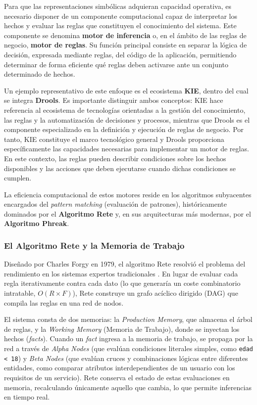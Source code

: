 \documentclass[12pt,a4paper]{report}
\begin{document}
Para que las representaciones simbólicas adquieran capacidad operativa, es necesario disponer de un componente computacional capaz de interpretar los hechos y evaluar las reglas que constituyen el conocimiento del sistema. Este componente se denomina \textbf{motor de inferencia} o, en el ámbito de las reglas de negocio, \textbf{motor de reglas}. Su función principal consiste en separar la lógica de decisión, expresada mediante reglas, del código de la aplicación, permitiendo determinar de forma eficiente qué reglas deben activarse ante un conjunto determinado de hechos.

Un ejemplo representativo de este enfoque es el ecosistema \textbf{KIE}, dentro del cual se integra \textbf{Drools}. Es importante distinguir ambos conceptos: KIE hace referencia al ecosistema de tecnologías orientadas a la gestión del conocimiento, las reglas y la automatización de decisiones y procesos, mientras que Drools es el componente especializado en la definición y ejecución de reglas de negocio. Por tanto, KIE constituye el marco tecnológico general y Drools proporciona específicamente las capacidades necesarias para implementar un motor de reglas. En este contexto, las reglas pueden describir condiciones sobre los hechos disponibles y las acciones que deben ejecutarse cuando dichas condiciones se cumplen.

La eficiencia computacional de estos motores reside en los algoritmos subyacentes encargados del \textit{pattern matching} (evaluación de patrones), históricamente dominados por el \textbf{Algoritmo Rete} y, en sus arquitecturas más modernas, por el \textbf{Algoritmo Phreak}.

\subsubsection{El Algoritmo Rete y la Memoria de Trabajo}
Diseñado por Charles Forgy en 1979, el algoritmo Rete resolvió el problema del rendimiento en los sistemas expertos tradicionales \cite{forgy1979rete}. En lugar de evaluar cada regla iterativamente contra cada dato (lo que generaría un coste combinatorio intratable, $O(R \times F)$), Rete construye un grafo acíclico dirigido (DAG) que compila las reglas en una red de nodos.

El sistema consta de dos memorias: la \textit{Production Memory}, que almacena el árbol de reglas, y la \textit{Working Memory} (Memoria de Trabajo), donde se inyectan los hechos (\textit{facts}). Cuando un \textit{fact} ingresa a la memoria de trabajo, se propaga por la red a través de \textit{Alpha Nodes} (que evalúan condiciones literales simples, como \texttt{edad < 18}) y \textit{Beta Nodes} (que evalúan cruces y combinaciones lógicas entre diferentes entidades, como comparar atributos interdependientes de un usuario con los requisitos de un servicio). Rete conserva el estado de estas evaluaciones en memoria, recalculando únicamente aquello que cambia, lo que permite inferencias en tiempo real.
\end{document}
